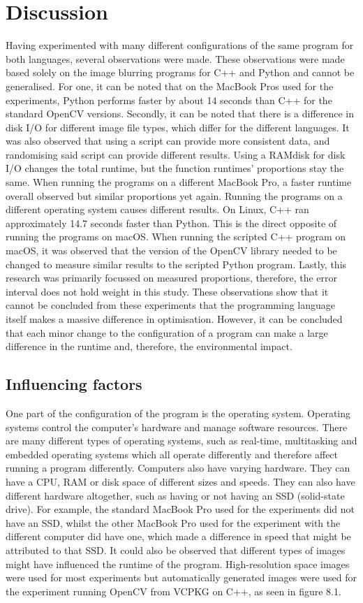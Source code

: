\chapter{Discussion}
Having experimented with many different configurations of the same program for both languages, several observations were made. These observations were made based solely on the image blurring programs for C++ and Python and cannot be generalised.
For one, it can be noted that on the MacBook Pros used for the experiments, Python performs faster by about 14 seconds than C++ for the standard OpenCV versions. Secondly, it can be noted that there is a difference in disk I/O for different image file types, which differ for the different languages. It was also observed that using a script can provide more consistent data, and randomising said script can provide different results. Using a RAMdisk for disk I/O changes the total runtime, but the function runtimes' proportions stay the same. When running the programs on a different MacBook Pro, a faster runtime overall observed but similar proportions yet again. Running the programs on a different operating system causes different results. On Linux, C++ ran approximately 14.7 seconds faster than Python. This is the direct opposite of running the programs on macOS. When running the scripted C++ program on macOS, it was observed that the version of the OpenCV library needed to be changed to measure similar results to the scripted Python program. Lastly, this research was primarily focussed on measured proportions, therefore, the error interval does not hold weight in this study.
These observations show that it cannot be concluded from these experiments that the programming language itself makes a massive difference in optimisation. However, it can be concluded that each minor change to the configuration of a program can make a large difference in the runtime and, therefore, the environmental impact.

\section{Influencing factors}
One part of the configuration of the program is the operating system. Operating systems control the computer’s hardware and manage software resources. There are many different types of operating systems, such as real-time, multitasking and embedded operating systems which all operate differently and therefore affect running a program differently.
Computers also have varying hardware. They can have a CPU, RAM or disk space of different sizes and speeds. They can also have different hardware altogether, such as having or not having an SSD (solid-state drive). For example, the standard MacBook Pro used for the experiments did not have an SSD, whilst the other MacBook Pro used for the experiment with the different computer did have one, which made a difference in speed that might be attributed to that SSD.
It could also be observed that different types of images might have influenced the runtime of the program. High-resolution space images were used for most experiments but automatically generated images were used for the experiment running OpenCV from VCPKG on C++, as seen in figure 8.1.

